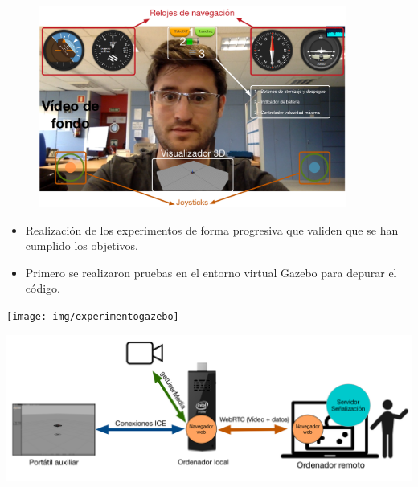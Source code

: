 \documentclass[notes,slidesec,a4]{seminar}
\begin{document}
\begin{hslide}
\begin{center}
\begin{figure}
\includegraphics[width=0.9\textwidth]{img/interfazweb}
\end{figure}
\end{center}
\end{hslide}


\begin{hslide}
\begin{itemize}
\item Realización de los experimentos de forma progresiva que validen que se han cumplido los objetivos.
\item Primero se realizaron pruebas en el entorno virtual Gazebo para depurar el código.
\end{itemize}

\begin{minipage}[t]{0.3\textwidth}
\texttt{[image: img/experimentogazebo]}
\end{minipage}
\begin{minipage}[t]{0.7\textwidth}
\includegraphics[width=\textwidth]{img/experimento1}
\end{minipage}
\end{hslide}
\end{document}
